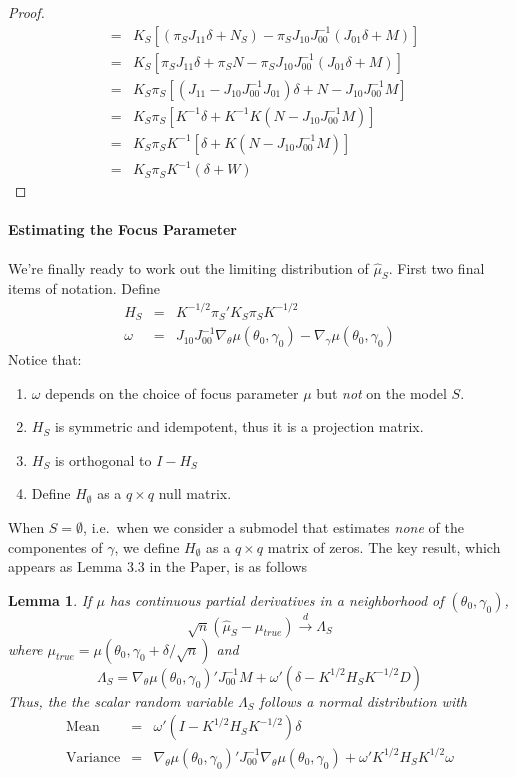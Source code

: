 \documentclass[12pt]{article}
\newtheorem{lem}{Lemma}
\theoremstyle{definition}
\begin{document}
\begin{proof}
\begin{eqnarray*}
&=& K_S \left[ \left(\pi_S J_{11}\delta + N_S \right) - \pi_S J_{10}J_{00}^{-1}\left(J_{01}\delta + M\right) \right]\\
&=& K_S \left[ \pi_S J_{11}\delta + \pi_S N - \pi_S J_{10}J_{00}^{-1}\left(J_{01}\delta + M\right) \right]\\
&=& K_S \pi_S \left[ \left(J_{11} - J_{10}J_{00}^{-1}J_{01}\right)\delta + N - J_{10}J_{00}^{-1} M \right]\\
&=& K_S \pi_S \left[ K^{-1}\delta +K^{-1}K \left(N - J_{10}J_{00}^{-1} M \right)\right]\\
&=& K_S \pi_S K^{-1} \left[ \delta +K \left(N - J_{10}J_{00}^{-1} M \right)\right]\\
&=& K_S \pi_S K^{-1} \left( \delta + W\right)
\end{eqnarray*}
\end{proof}

\paragraph{Estimating the Focus Parameter} We're finally ready to work out the limiting distribution of $\widehat{\mu}_S$. 
First two final items of notation. 
Define
\begin{eqnarray*}
H_S &=& K^{-1/2}\pi_S' K_S \pi_SK^{-1/2} \\
\omega &=& J_{10}J_{00}^{-1} \nabla_\theta \mu(\theta_0,\gamma_0) - \nabla_\gamma \mu(\theta_0, \gamma_0)
\end{eqnarray*}
Notice that:
\begin{enumerate}
\item $\omega$ depends on the choice of focus parameter $\mu$ but \emph{not} on the model $S$.
\item $H_S$ is symmetric and idempotent, thus it is a projection matrix.
\item $H_S$ is orthogonal to $I - H_S$
\item Define $H_{\emptyset}$ as a $q\times q$ null matrix.
\end{enumerate}
When $S = \emptyset$, i.e.\ when we consider a submodel that estimates \emph{none} of the componentes of $\gamma$, we define $H_\emptyset$ as a $q\times q$ matrix of zeros. 
The key result, which appears as Lemma 3.3 in the Paper, is as follows
\begin{lem}
\label{lem:mu}
If $\mu$ has continuous partial derivatives in a neighborhood of $(\theta_0, \gamma_0)$,
$$
\sqrt{n}\left( \hat{\mu}_S - \mu_{true} \right) \overset{d}{\rightarrow} \Lambda_S
$$
where $\mu_{true} = \mu(\theta_0, \gamma_0+\delta/\sqrt{n})$ and
$$
\Lambda_S = \nabla_\theta \mu(\theta_0, \gamma_0)' J_{00}^{-1} M + \omega'\left( \delta - K^{1/2}H_S K^{-1/2}D\right)
$$
Thus, the the scalar random variable $\Lambda_S$ follows a normal distribution with
\begin{eqnarray*}
\mbox{Mean}&=&\omega'(I - K^{1/2}H_SK^{-1/2})\delta\\
\mbox{Variance}&=&\nabla_\theta \mu(\theta_0, \gamma_0)'J_{00}^{-1}\nabla_\theta \mu(\theta_0, \gamma_0) + \omega'K^{1/2}H_S K^{1/2}\omega
\end{eqnarray*}	
\end{lem}
\end{document}
